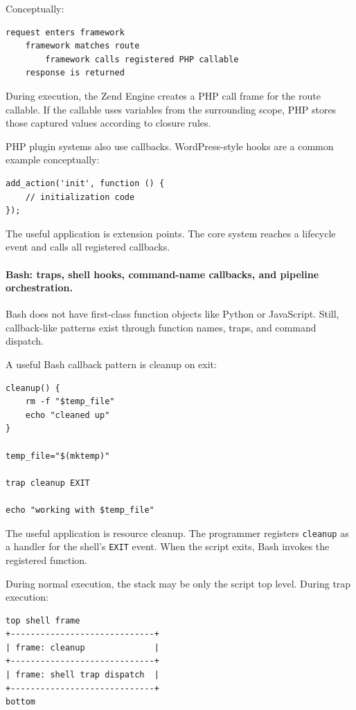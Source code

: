 Conceptually:

\begin{verbatim}
request enters framework
    framework matches route
        framework calls registered PHP callable
    response is returned
\end{verbatim}

During execution, the Zend Engine creates a PHP call frame for the route callable. If the callable uses variables from the surrounding scope, PHP stores those captured values according to closure rules.

PHP plugin systems also use callbacks. WordPress-style hooks are a common example conceptually:

\begin{verbatim}
add_action('init', function () {
    // initialization code
});
\end{verbatim}

The useful application is extension points. The core system reaches a lifecycle event and calls all registered callbacks.

\paragraph{Bash: traps, shell hooks, command-name callbacks, and pipeline orchestration.}

Bash does not have first-class function objects like Python or JavaScript. Still, callback-like patterns exist through function names, traps, and command dispatch.

A useful Bash callback pattern is cleanup on exit:

\begin{verbatim}
cleanup() {
    rm -f "$temp_file"
    echo "cleaned up"
}

temp_file="$(mktemp)"

trap cleanup EXIT

echo "working with $temp_file"
\end{verbatim}

The useful application is resource cleanup. The programmer registers \texttt{cleanup} as a handler for the shell's \texttt{EXIT} event. When the script exits, Bash invokes the registered function.

During normal execution, the stack may be only the script top level. During trap execution:

\begin{verbatim}
top shell frame
+-----------------------------+
| frame: cleanup              |
+-----------------------------+
| frame: shell trap dispatch  |
+-----------------------------+
bottom
\end{verbatim}


